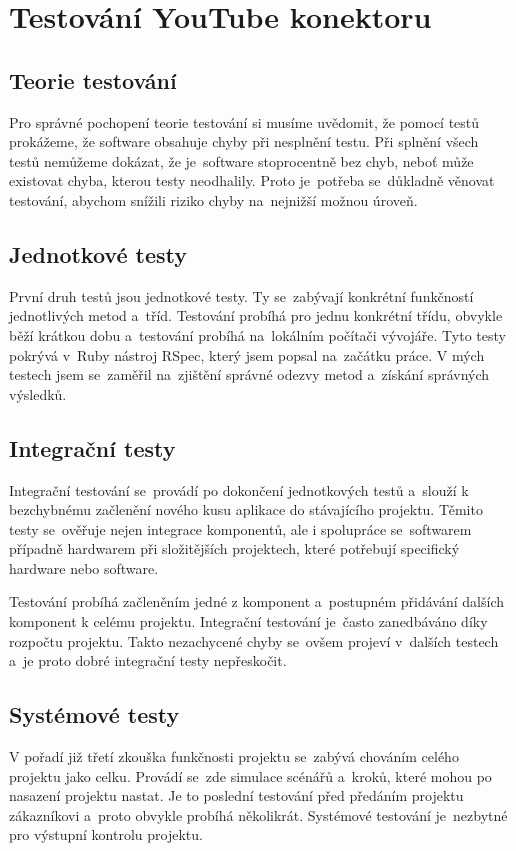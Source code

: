 \section{Testování YouTube konektoru}
\subsection{Teorie testování}
\par Pro správné pochopení teorie testování\cite{si1} si musíme uvědomit, že pomocí testů prokážeme, že software obsahuje chyby při nesplnění testu. Při splnění všech testů nemůžeme dokázat, že je~software stoprocentně bez chyb, neboť může existovat chyba, kterou testy neodhalily. Proto je~potřeba se~důkladně věnovat testování, abychom snížili riziko chyby na~nejnižší možnou úroveň.
\subsection{Jednotkové testy}
\par První druh testů jsou jednotkové testy\cite{si1}. Ty se~zabývají konkrétní funkčností jednotlivých metod a~tříd. Testování probíhá pro jednu konkrétní třídu, obvykle běží krátkou dobu a~testování probíhá na~lokálním počítači vývojáře. Tyto testy pokrývá v~Ruby nástroj RSpec, který jsem popsal na~začátku práce. V mých testech jsem se~zaměřil na~zjištění správné odezvy metod a~získání správných výsledků.
\subsection{Integrační testy}
\par Integrační testování\cite{si1} se~provádí po dokončení jednotkových testů a~slouží k bezchybnému začlenění nového kusu aplikace do stávajícího projektu. Těmito testy se~ověřuje nejen integrace komponentů, ale i spolupráce se~softwarem případně hardwarem při složitějších projektech, které potřebují specifický hardware nebo software. 
\par Testování probíhá začleněním jedné z komponent a~postupném přidávání dalších komponent k celému projektu. Integrační testování je~často zanedbáváno díky rozpočtu projektu. Takto nezachycené chyby se~ovšem projeví v~dalších testech a~je proto dobré integrační testy nepřeskočit.
\subsection{Systémové testy}
\par V pořadí již třetí zkouška funkčnosti projektu se~zabývá chováním celého projektu jako celku. Provádí se~zde simulace scénářů a~kroků, které mohou po nasazení projektu nastat. Je to poslední testování před předáním projektu zákazníkovi a~proto obvykle probíhá několikrát. Systémové testování\cite{si1} je~nezbytné pro výstupní kontrolu projektu.
